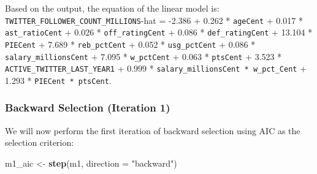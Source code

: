\documentclass[]{article}
\newenvironment{Shaded}{\begin{snugshade}}{\end{snugshade}}
\newcommand{\DataTypeTok}[1]{\textcolor[rgb]{0.13,0.29,0.53}{#1}}
\newcommand{\KeywordTok}[1]{\textcolor[rgb]{0.13,0.29,0.53}{\textbf{#1}}}
\newcommand{\NormalTok}[1]{#1}
\newcommand{\StringTok}[1]{\textcolor[rgb]{0.31,0.60,0.02}{#1}}
\begin{document}
Based on the output, the equation of the linear model is:
\texttt{TWITTER\_FOLLOWER\_COUNT\_MILLIONS}-hat = -2.386 + 0.262 *
\texttt{ageCent} + 0.017 * \texttt{ast\_ratioCent} + 0.026 *
\texttt{off\_ratingCent} + 0.086 * \texttt{def\_ratingCent} + 13.104 *
\texttt{PIECent} + 7.689 * \texttt{reb\_pctCent} + 0.052 *
\texttt{usg\_pctCent} + 0.086 * \texttt{salary\_millionsCent} + 7.095 *
\texttt{w\_pctCent} + 0.063 * \texttt{ptsCent} + 3.523 *
\texttt{ACTIVE\_TWITTER\_LAST\_YEAR1} + 0.999 *
\texttt{salary\_millionsCent\ *\ w\_pct\_Cent} + 1.293 *
\texttt{PIECent\ *\ ptsCent}.

\hypertarget{backward-selection-iteration-1}{%
\subsubsection{Backward Selection (Iteration
1)}\label{backward-selection-iteration-1}}

We will now perform the first iteration of backward selection using AIC
as the selection criterion:

\begin{Shaded}
\begin{Highlighting}[]
\NormalTok{m1_aic <-}\StringTok{ }\KeywordTok{step}\NormalTok{(m1, }\DataTypeTok{direction =} \StringTok{"backward"}\NormalTok{)}
\end{Highlighting}
\end{Shaded}
\end{document}
